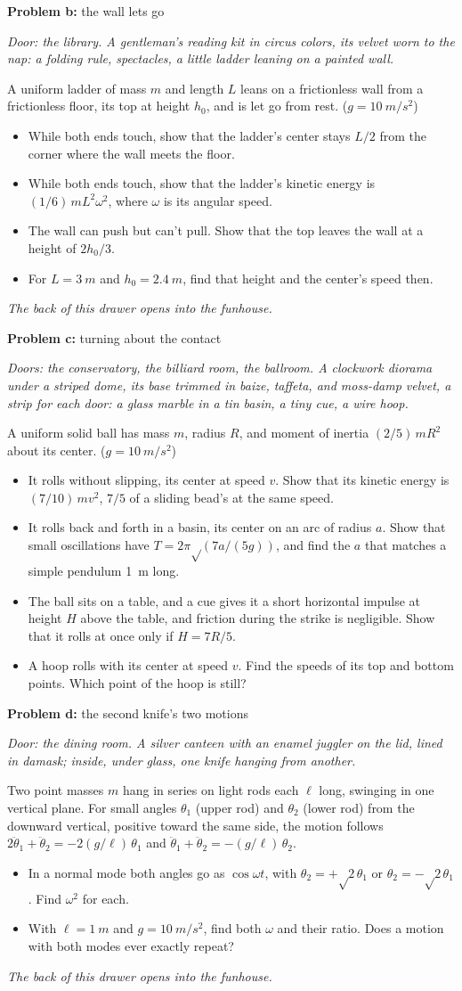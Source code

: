 \documentclass[11pt]{article}
\newcommand{\scene}[1]{\par{\itshape #1}\par}
\newcommand{\problem}[2]{\par\medskip\textbf{Problem #1:} #2\par\nopagebreak}
\newenvironment{parts}{\begin{itemize}[leftmargin=3.4em,labelwidth=2.8em,labelsep=0.6em,align=left,itemsep=3pt,topsep=4pt]}{\end{itemize}}
\newcommand{\pt}[1]{\item[\textbf{#1}]}
\newcommand{\rt}{\text{√}}  %
\begin{document}
\problem{b}{the wall lets go}
\scene{Door: the library. A gentleman's reading kit in circus colors, its velvet worn to the nap: a folding rule, spectacles, a little ladder leaning on a painted wall.}
A uniform ladder of mass $m$ and length $L$ leans on a frictionless wall from a frictionless floor, its top at height $h_0$, and is let go from rest. ($g = \SI{10}{m/s^2}$)
\begin{parts}
\pt{b-1} While both ends touch, show that the ladder's center stays $L/2$ from the corner where the wall meets the floor.
\pt{b-2} While both ends touch, show that the ladder's kinetic energy is $(1/6)\,mL^2\omega^2$, where $\omega$ is its angular speed.
\pt{b-3} The wall can push but can't pull. Show that the top leaves the wall at a height of $2h_0/3$.
\pt{b-4} For $L = \SI{3}{m}$ and $h_0 = \SI{2.4}{m}$, find that height and the center's speed then.
\end{parts}
\scene{The back of this drawer opens into the funhouse.}

\clearpage
\problem{c}{turning about the contact}
\scene{Doors: the conservatory, the billiard room, the ballroom. A clockwork diorama under a striped dome, its base trimmed in baize, taffeta, and moss-damp velvet, a strip for each door: a glass marble in a tin basin, a tiny cue, a wire hoop.}
A uniform solid ball has mass $m$, radius $R$, and moment of inertia $(2/5)\,mR^2$ about its center. ($g = \SI{10}{m/s^2}$)
\begin{parts}
\pt{c-1} It rolls without slipping, its center at speed $v$. Show that its kinetic energy is $(7/10)\,mv^2$, $7/5$ of a sliding bead's at the same speed.
\pt{c-2} It rolls back and forth in a basin, its center on an arc of radius $a$. Show that small oscillations have $T = 2\pi\rt(7a/(5g))$, and find the $a$ that matches a simple pendulum \SI{1}{m} long.
\pt{c-3} The ball sits on a table, and a cue gives it a short horizontal impulse at height $H$ above the table, and friction during the strike is negligible. Show that it rolls at once only if $H = 7R/5$.
\pt{c-4} A hoop rolls with its center at speed $v$. Find the speeds of its top and bottom points. Which point of the hoop is still?
\end{parts}

\problem{d}{the second knife's two motions}
\scene{Door: the dining room. A silver canteen with an enamel juggler on the lid, lined in damask; inside, under glass, one knife hanging from another.}
Two point masses $m$ hang in series on light rods each $\ell$ long, swinging in one vertical plane. For small angles $\theta_1$ (upper rod) and $\theta_2$ (lower rod) from the downward vertical, positive toward the same side, the motion follows $2\ddot\theta_1 + \ddot\theta_2 = -2(g/\ell)\,\theta_1$ and $\ddot\theta_1 + \ddot\theta_2 = -(g/\ell)\,\theta_2$.
\begin{parts}
\pt{d-1} In a normal mode both angles go as $\cos\omega t$, with $\theta_2 = +\rt2\,\theta_1$ or $\theta_2 = -\rt2\,\theta_1$. Find $\omega^2$ for each.
\pt{d-2} With $\ell = \SI{1}{m}$ and $g = \SI{10}{m/s^2}$, find both $\omega$ and their ratio. Does a motion with both modes ever exactly repeat?
\end{parts}
\scene{The back of this drawer opens into the funhouse.}
\end{document}
